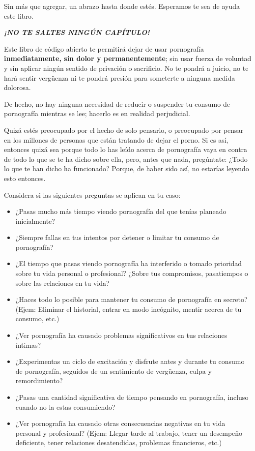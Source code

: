 \documentclass[
  openany]{book}
\providecommand{\tightlist}{%
  \setlength{\itemsep}{0pt}\setlength{\parskip}{0pt}}
\begin{document}
Sin más que agregar, un abrazo hasta donde estés. Esperamos te sea de ayuda este libro.

{\emph{\textbf{¡NO TE SALTES NINGÚN CAPÍTULO!}}}

Este libro de código abierto te permitirá dejar de usar pornografía \textbf{inmediatamente, sin dolor y permanentemente}; sin usar fuerza de voluntad y sin aplicar ningún sentido de privación o sacrificio. No te pondrá a juicio, no te hará sentir vergüenza ni te pondrá presión para someterte a ninguna medida dolorosa.

De hecho, no hay ninguna necesidad de reducir o suspender tu consumo de pornografía mientras se lee; hacerlo es en realidad perjudicial.

Quizá estés preocupado por el hecho de solo pensarlo, o preocupado por pensar en los millones de personas que están tratando de dejar el porno. Si es así, entonces quizá sea porque todo lo has leído acerca de pornografía vaya en contra de todo lo que se te ha dicho sobre ella, pero, antes que nada, pregúntate: ¿Todo lo que te han dicho ha funcionado? Porque, de haber sido así, no estarías leyendo esto entonces.

Considera si las siguientes preguntas se aplican en tu caso:

\begin{itemize}
\tightlist
\item
  ¿Pasas mucho más tiempo viendo pornografía del que tenías planeado inicialmente?
\item
  ¿Siempre fallas en tus intentos por detener o limitar tu consumo de pornografía?
\item
  ¿El tiempo que pasas viendo pornografía ha interferido o tomado prioridad sobre tu vida personal o profesional? ¿Sobre tus compromisos, pasatiempos o sobre las relaciones en tu vida?
\item
  ¿Haces todo lo posible para mantener tu consumo de pornografía en secreto? (Ejem: Eliminar el historial, entrar en modo incógnito, mentir acerca de tu consumo, etc.)
\item
  ¿Ver pornografía ha causado problemas significativos en tus relaciones íntimas?
\item
  ¿Experimentas un ciclo de excitación y disfrute antes y durante tu consumo de pornografía, seguidos de un sentimiento de vergüenza, culpa y remordimiento?
\item
  ¿Pasas una cantidad significativa de tiempo pensando en pornografía, incluso cuando no la estas consumiendo?
\item
  ¿Ver pornografía ha causado otras consecuencias negativas en tu vida personal y profesional? (Ejem: Llegar tarde al trabajo, tener un desempeño deficiente, tener relaciones desatendidas, problemas financieros, etc.)
\end{itemize}
\end{document}
